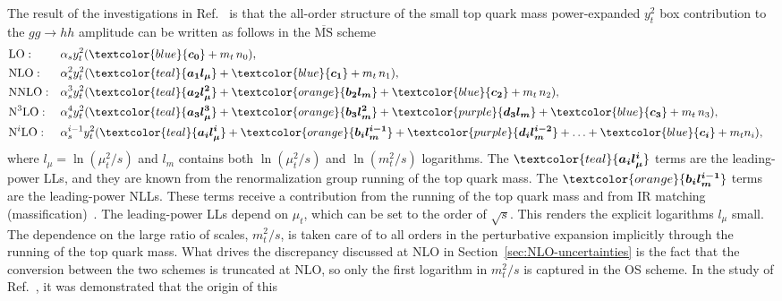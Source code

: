 The result of the investigations in Ref.~\cite{Jaskiewicz:2024xkd}
is that the all-order structure of the small top quark mass
power-expanded $y_t^2$ box contribution to the $gg \rightarrow hh$
amplitude can be written as follows in the $\overline{\mathrm{MS}}$ scheme
\begin{align}\label{eq:schem-lo}
& \mathrm{LO}: & &\alpha_s y_t^2 ( \textcolor{blue}{\boldsymbol{c_0}} + m_t \, n_0 ), & \\
& \mathrm{NLO}: & &\alpha_s^2 y_t^2  ( \textcolor{teal}{\boldsymbol{a_1 l_\mu}} + \textcolor{blue}{\boldsymbol{c_1}} + m_t \, n_1  ), & \\
& \mathrm{NNLO}: & &\alpha_s^3 y_t^2  ( \textcolor{teal}{\boldsymbol{a_2 l_\mu^2}} + \textcolor{orange}{\boldsymbol{b_2} \boldsymbol{l_m}} + \textcolor{blue}{\boldsymbol{c_2}} + m_t \, n_2 ), & \\
& \mathrm{N}^3\mathrm{LO}: & &\alpha_s^4 y_t^2 ( \textcolor{teal}{\boldsymbol{a_3 l_\mu^3}} + \textcolor{orange}{\boldsymbol{b_3} \boldsymbol{l_m^2}} + \textcolor{purple}{\boldsymbol{d_3 l_m}} + \textcolor{blue}{\boldsymbol{c_3}} + m_t \, n_3 ), & \\
& \mathrm{N}^i\mathrm{LO}: &
&\alpha_s^{i-1} y_t^2 ( \textcolor{teal}{\boldsymbol{a_i l_\mu^i}} + \textcolor{orange}{\boldsymbol{b_i} \boldsymbol{l_m^{i-1}}}
+   \textcolor{purple}{\boldsymbol{
 d_i l_m^{i-2}}} + \ldots + \textcolor{blue}{\boldsymbol{c_i}} + m_t n_i ),&\label{eq:schem-nklo}
\end{align}
where $l_\mu = \ln(\mu_t^2/s)$ and $l_m$ contains both $\ln(\mu_t^2/s)$ and $\ln(m_t^2/s)$ logarithms. 
The $\textcolor{teal}{\boldsymbol{a_i l_\mu^i}}$ terms are the leading-power LLs, and they are known from the renormalization group running of the top quark mass.
The $\textcolor{orange}{\boldsymbol{b_i} \boldsymbol{l_m^{i-1}}}$ terms are the leading-power NLLs. These terms receive a contribution from the running of the top quark mass and from IR matching (massification)~\cite{Penin:2005eh, Mitov:2006xs, Becher:2007cu, Liu:2017axv, Engel:2018fsb, Wang:2023qbf, Wang:2024pmv}. The leading-power LLs depend on $\mu_t$, which can be set to the order of $\sqrt{s}$. This renders the explicit logarithms $l_\mu$ small. The dependence on the
large ratio of scales, $m_t^2/s$, is taken care of to all orders in the perturbative expansion implicitly through the running of the top quark mass. What drives the discrepancy discussed at NLO in Section~\ref{sec:NLO-uncertainties} is the fact that the conversion between the two schemes is truncated at NLO, so only the first logarithm in $m_t^2/s$ is captured in the OS scheme. In the study of Ref.~\cite{Jaskiewicz:2024xkd}, it was demonstrated that the origin of this
